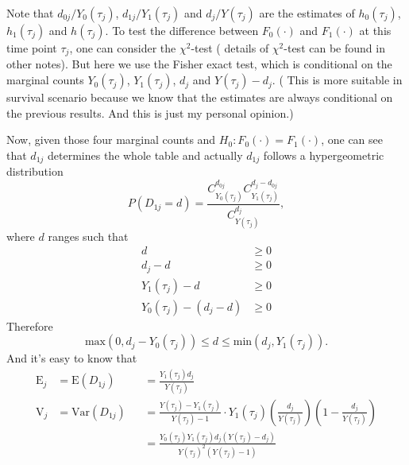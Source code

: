 \documentclass[a4paper,12pt]{article}
\begin{document}
Note that $d_{0j}/ Y_{0}\left(\tau_j\right)$, $d_{1j}/ Y_{1}\left(\tau_j\right)$ and $d_{j}/ Y\left(\tau_j\right)$ are the estimates of $h_0\left(\tau_j\right)$, $h_1\left(\tau_j\right)$ and $h\left(\tau_j\right)$. To test the difference between $F_0\left(\cdot\right)$ and $F_1\left(\cdot\right)$ at this time point $\tau_j$, one can consider the $\chi^2$-test ({\color{blue} details of $\chi^2$-test can be found in other notes}). But here we use the Fisher exact test, which is conditional on the marginal counts $Y_0\left(\tau_j\right)$, $Y_1\left(\tau_j\right)$, $d_j$ and $Y\left(\tau_j\right) - d_j$. ({\color{blue} This is more suitable in survival scenario because we know that the estimates are always conditional on the previous results. And this is just my personal opinion.})
\par
Now, given those four marginal counts and $H_0: F_0\left(\cdot\right) = F_1\left(\cdot\right)$, one can see that $d_{1j}$ determines the whole table and actually $d_{1j}$ follows a hypergeometric distribution
\[
  P\left(D_{1j} = d\right) =
  \frac{
    C_{Y_0\left(\tau_j\right)}^{d_{0j}}
    C_{Y_1\left(\tau_j\right)}^{d_j - d_{0j}}
  }{
    C_{Y\left(\tau_j\right)}^{d_j}
  }
  ,
\]
where $d$ ranges such that
\[
  \begin{aligned}
    d &\geq 0    \\
    d_j - d &\geq 0    \\
    Y_1\left(\tau_j\right) - d &\geq 0    \\
    Y_0\left(\tau_j\right) - \left(d_j - d\right) &\geq 0
  \end{aligned}
\]
Therefore
\[
  \mathrm{max}\left(0, d_j - Y_0\left(\tau_j\right)\right)
  \leq d
  \leq \mathrm{min}\left(d_j, Y_1\left(\tau_j\right)\right)
  .
\]
And it's easy to know that
\[
  \begin{aligned}
    \mathrm{E}_j &= \mathrm{E}\left(D_{1j}\right) &&= \frac{Y_1\left(\tau_j\right)d_j}{Y\left(\tau_j\right)}    \\
    \mathrm{V}_j &= \mathrm{Var}\left(D_{1j}\right) &&=
                                       \frac{Y\left(\tau_j\right) - Y_1\left(\tau_j\right)}{Y\left(\tau_j\right) - 1}
                                       \cdot Y_1\left(\tau_j\right)
                                       \left(
                                       \frac{d_j}{Y\left(\tau_j\right)}
                                       \right)
                                       \left(
                                       1 - \frac{d_j}{Y\left(\tau_j\right)}
                                       \right)    \\
    && &= \frac{
       Y_0\left(\tau_j\right)Y_1\left(\tau_j\right)d_j\left(Y\left(\tau_j\right) - d_j\right)
       }{
       Y\left(\tau_j\right)^2
       \left(Y\left(\tau_j\right) - 1\right)
       }
  \end{aligned}
\]
\end{document}
